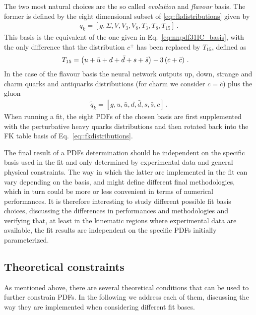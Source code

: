 %
The two most natural choices are the so called \textit{evolution} and \textit{flavour} basis.
The former is defined by the eight dimensional subset of \eqref{eq::fkdistributions} given by 
\begin{align}
    \label{eq:evolution_basis}
    q_k = \left[g, \Sigma, V, V_3, V_8, T_3, T_8, T_{15} \right]\,.
\end{align}
This basis is the equivalent of the one given in Eq.~\eqref{eq:nnpdf31IC_basis}, with the only difference
that the distribution $c^+$ has been replaced by $T_{15}$, defined as 
\begin{align}
    T_{15}     &=  \left( u+\bar{u} +  d+\bar{d} +  s+\bar{s} \right) - 3\left(   c+\bar{c}\right) \, .
\end{align}
In the case of the flavour basis the neural network outputs   
up, down, strange and charm quarks and antiquarks distributions (for charm we consider $c=\bar{c}$) plus the gluon
\begin{align}
    \label{eq:flavour_basis}
	\tilde{q}_k = \left[g, u, \bar{u}, d, \bar{d}, s, \bar{s}, c\right]\,.
\end{align} 
When running a fit, the eight PDFs of the chosen basis are first supplemented with the perturbative heavy quarks
distributions and then rotated back into the FK table basis of Eq.~\eqref{eq::fkdistributions}.

%
The final result of a PDFs determination should be independent on the specific basis used in the fit
and only determined by experimental data and general physical constraints.
The way in which the latter are implemented in the fit can vary depending on the basis,
and might define different final methodologies, which in turn could be more or less convenient
in terms of numerical performances. It is therefore interesting to study different possible
fit basis choices, discussing the differences in performances and methodologies and verifying that,
at least in the kinematic regions where experimental data are available, the 
fit results are independent on the specific PDFs initially parameterized.


\subsection{Theoretical constraints}
\label{sec:theory_constraints}

As mentioned above, there are several theoretical conditions that can be used to further constrain PDFs.
In the following we address each of them, discussing the way they are implemented when considering
different fit bases.

